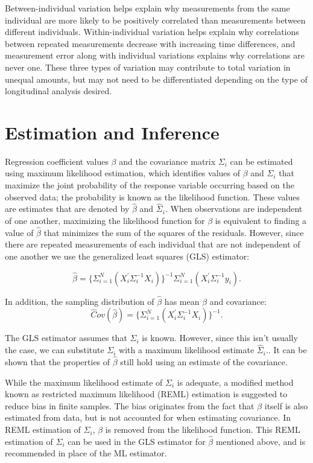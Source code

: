 \documentclass[12pt, twoside]{amherstthesis}
\begin{document}
Between-individual variation helps explain why measurements from the same individual are more likely to be positively correlated than measurements between different individuals. Within-individual variation helps explain why correlations between repeated measurements decrease with increasing time differences, and measurement error along with individual variations explains why correlations are never one. These three types of variation may contribute to total variation in unequal amounts, but may not need to be differentiated depending on the type of longitudinal analysis desired.

\hypertarget{estimation-and-inference}{%
\section{Estimation and Inference}\label{estimation-and-inference}}

Regression coefficient values \(\beta\) and the covariance matrix \(\Sigma_i\) can be estimated using maximum likelihood estimation, which identifies values of \(\beta\) and \(\Sigma_i\) that maximize the joint probability of the response variable occurring based on the observed data; the probability is known as the likelihood function. These values are estimates that are denoted by \(\hat\beta\) and \(\hat\Sigma_i.\) When observations are independent of one another, maximizing the likelihood function for \(\beta\) is equivalent to finding a value of \(\hat\beta\) that minimizes the sum of the squares of the residuals. However, since there are repeated measurements of each individual that are not independent of one another we use the generalized least squares (GLS) estimator:

\[\hat\beta = \{ \Sigma_{i=1}^N(X_i^{'}\Sigma^{-1}_iX_i) \}^{-1}\Sigma_{i=1}^N(X_i^{'}\Sigma^{-1}_iy_i).\]

In addition, the sampling distribution of \(\hat\beta\) has mean \(\beta\) and covariance:
\[\hat Cov(\hat\beta) = \{ \Sigma_{i=1}^N(X_i^{'}\Sigma^{-1}_iX_i) \}^{-1}.\]

The GLS estimator assumes that \(\Sigma_i\) is known. However, since this isn't usually the case, we can substitute \(\Sigma_i\) with a maximum likelihood estimate \(\hat\Sigma_i.\). It can be shown that the properties of \(\hat\beta\) still hold using an estimate of the covariance.

While the maximum likelihood estimate of \(\Sigma_i\) is adequate, a modified method known as restricted maximum likelihood (REML) estimation is suggested to reduce bias in finite samples. The bias originates from the fact that \(\beta\) itself is also estimated from data, but is not accounted for when estimating covariance. In REML estimation of \(\Sigma_i\), \(\beta\) is removed from the likelihood function. This REML estimation of \(\Sigma_i\) can be used in the GLS estimator for \(\hat\beta\) mentioned above, and is recommended in place of the ML estimator.
\end{document}
